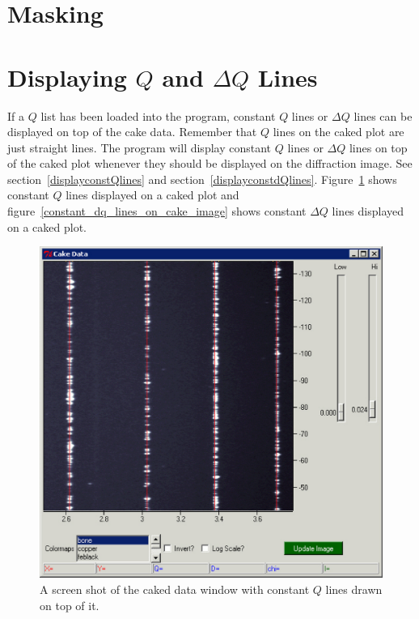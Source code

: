\section{Masking}

\section{\texorpdfstring{Displaying $Q$ and $\Delta Q$ Lines}
    {Displaying Q and delta Q Lines}}
    \label{cakeQlinesandpeaks}

If a $Q$ list has been loaded into the program, 
constant $Q$ lines or $\Delta Q$ lines can be 
displayed on top of the cake data. Remember that 
$Q$ lines on the caked plot are just straight lines. 
The program will display constant $Q$ lines or 
$\Delta Q$ lines on top of the caked plot whenever they 
should be displayed on the diffraction image. See 
section~\ref{displayconstQlines} and 
section~\ref{displayconstdQlines}.
Figure~\ref{constant_q_lines_on_cake_image} shows constant
$Q$ lines displayed on a caked plot and 
figure~\ref{constant_dq_lines_on_cake_image} shows constant
$\Delta Q$ lines displayed on a caked plot.

\begin{figure}
    \centering
    \includegraphics[scale=.75]{figures/constant_q_lines_on_cake_image.eps}
    \caption{A screen shot of the caked data window
    with constant $Q$ lines drawn on top of it.}
    \label{constant_q_lines_on_cake_image}
\end{figure}

